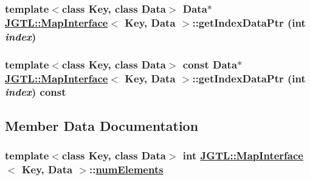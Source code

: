 \hypertarget{class_j_g_t_l_1_1_map_interface_e2b0ad1f3959cf7f8d1c6ef07c5a8c2c}{
\subsubsection[getIndexDataPtr]{\setlength{\rightskip}{0pt plus 5cm}template$<$class Key, class Data$>$ Data$\ast$ \hyperlink{class_j_g_t_l_1_1_map_interface}{JGTL::Map\-Interface}$<$ Key, Data $>$::get\-Index\-Data\-Ptr (int {\em index})}}
\label{class_j_g_t_l_1_1_map_interface_e2b0ad1f3959cf7f8d1c6ef07c5a8c2c}


\hypertarget{class_j_g_t_l_1_1_map_interface_cbbfe062862b57f4e0027026f81562a9}{
\subsubsection[getIndexDataPtr]{\setlength{\rightskip}{0pt plus 5cm}template$<$class Key, class Data$>$ const Data$\ast$ \hyperlink{class_j_g_t_l_1_1_map_interface}{JGTL::Map\-Interface}$<$ Key, Data $>$::get\-Index\-Data\-Ptr (int {\em index}) const}}
\label{class_j_g_t_l_1_1_map_interface_cbbfe062862b57f4e0027026f81562a9}




\subsection{Member Data Documentation}
\hypertarget{class_j_g_t_l_1_1_map_interface_02b41b644ec9f7fc80888f2a621262e3}{
\subsubsection[numElements]{\setlength{\rightskip}{0pt plus 5cm}template$<$class Key, class Data$>$ int \hyperlink{class_j_g_t_l_1_1_map_interface}{JGTL::Map\-Interface}$<$ Key, Data $>$::\hyperlink{class_j_g_t_l_1_1_map_interface_02b41b644ec9f7fc80888f2a621262e3}{num\-Elements}}}
\label{class_j_g_t_l_1_1_map_interface_02b41b644ec9f7fc80888f2a621262e3}


